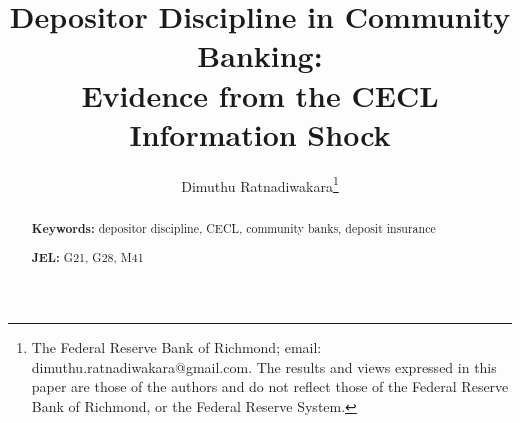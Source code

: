 \documentclass[12pt]{article}
\begin{document}
\title{Depositor Discipline in Community Banking: \\Evidence from the CECL Information Shock}

\author{Dimuthu Ratnadiwakara\thanks{The Federal Reserve Bank of
Richmond; email: dimuthu.ratnadiwakara@gmail.com. The results and views
expressed in this paper are those of the authors and do not reflect
those of the Federal Reserve Bank of Richmond, or the Federal Reserve
System.}}

\date{}

\maketitle

\begin{abstract}
\begin{singlespace}

\medskip

\noindent \textbf{Keywords:} depositor discipline, CECL, community banks, deposit insurance

\noindent \textbf{JEL:} G21, G28, M41

\end{singlespace}
\end{abstract}



\thispagestyle{empty}

\clearpage















\clearpage
\onehalfspacing





\end{document}
